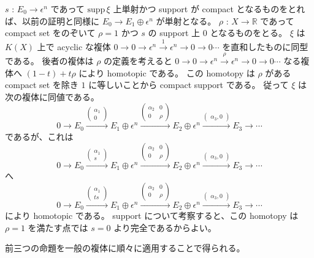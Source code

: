 \documentclass[dvipdfmx]{jsarticle}
\begin{document}
\begin{Proof}[(3)]
\itemprof
  \(s\) : \(E_0 \to \epsilon^n\) であって \(\text{supp} \, \xi\) 上単射かつ support が compact となるものをとれば、以前の証明と同様に \(E_0 \to E_1 \oplus \epsilon^n\) が単射となる。
  \(\rho\) : \(X \to \mathbb{R}\) であって compact set をのぞいて \(\rho = 1\) かつ \(s\) の support 上 \(0\) となるものをとる。
  \(\xi\) は \(K(X)\) 上で acyclic な複体 \(0 \to 0 \to \epsilon^n \overset{1}{\to} \epsilon^n \to 0 \to 0 \cdots\) を直和したものに同型である。
  後者の複体は \(\rho\) の定義を考えると \(0 \to 0 \to \epsilon^n \overset{\rho}{\to} \epsilon^n \to 0 \to 0 \cdots\) なる複体へ \((1 - t) + t \rho\) により homotopic である。
  この homotopy は \(\rho\) がある compact set を除き \(1\) に等しいことから compact support である。
  従って \(\xi\) は次の複体に同値である。
  \[0 \to E_0 \overset{
    \begin{pmatrix}
      \alpha_1 \\
      0
    \end{pmatrix}
  }{\to} E_1 \oplus \epsilon^n \overset{
    \begin{pmatrix}
      \alpha_2 & 0 \\
      0 & \rho
    \end{pmatrix}
  }{\to} E_2 \oplus \epsilon^n \overset{
    \begin{pmatrix}
      \alpha_3 , 0
    \end{pmatrix}
  }{\to} E_3 \to \cdots\]
  であるが、これは
  \[0 \to E_0 \overset{
    \begin{pmatrix}
      \alpha_1 \\
      s
    \end{pmatrix}
  }{\to} E_1 \oplus \epsilon^n \overset{
    \begin{pmatrix}
      \alpha_2 & 0 \\
      0 & \rho
    \end{pmatrix}
  }{\to} E_2 \oplus \epsilon^n \overset{
    \begin{pmatrix}
      \alpha_3 , 0
    \end{pmatrix}
  }{\to} E_3 \to \cdots\]
  へ
  \[0 \to E_0 \overset{
    \begin{pmatrix}
      \alpha_1 \\
      t s
    \end{pmatrix}
  }{\to} E_1 \oplus \epsilon^n \overset{
    \begin{pmatrix}
      \alpha_2 & 0 \\
      0 & \rho
    \end{pmatrix}
  }{\to} E_2 \oplus \epsilon^n \overset{
    \begin{pmatrix}
      \alpha_3 , 0
    \end{pmatrix}
  }{\to} E_3 \to \cdots\]
  により homotopic である。
  support について考察すると、この homotopy は \(\rho = 1\) を満たす点では \(s = 0\) より完全であるからよい。
\end{Proof}

\begin{Proof}[(4)]
\itemprof
  前三つの命題を一般の複体に順々に適用することで得られる。
\end{Proof}
\end{document}
